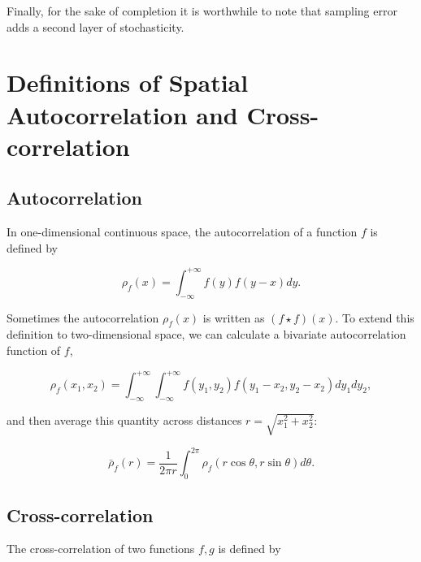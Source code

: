 \documentclass{article}
\begin{document}
Finally, for the sake of completion it is worthwhile to note that
sampling error adds a second layer of stochasticity.

\newpage

\appendix

\hypertarget{definitions-of-spatial-autocorrelation-and-cross-correlation}{%
\section{\texorpdfstring{Definitions of Spatial Autocorrelation and
Cross-correlation
\label{corr-defs}}{Definitions of Spatial Autocorrelation and Cross-correlation }}\label{definitions-of-spatial-autocorrelation-and-cross-correlation}}

\hypertarget{autocorrelation}{%
\subsection{Autocorrelation}\label{autocorrelation}}

In one-dimensional continuous space, the autocorrelation of a function
\(f\) is defined by

\begin{equation}
  \rho_f(x)=\int_{-\infty}^{+\infty}f(y)f(y-x)dy.
\end{equation}

Sometimes the autocorrelation \(\rho_f(x)\) is written as
\((f\star f)(x)\). To extend this definition to two-dimensional space,
we can calculate a bivariate autocorrelation function of \(f\),

\begin{equation}
  \rho_f(x_1,x_2)=\int_{-\infty}^{+\infty}\int_{-\infty}^{+\infty}f(y_1,y_2)f(y_1-x_2,y_2-x_2)dy_1dy_2,
\end{equation}

and then average this quantity across distances
\(r=\sqrt{x_1^2+x_2^2}\):

\begin{equation}
  \bar\rho_f(r)=\frac{1}{2\pi r}\int_0^{2\pi}\rho_f(r\cos\theta,r\sin\theta)d\theta.
\end{equation}

\hypertarget{cross-correlation}{%
\subsection{Cross-correlation}\label{cross-correlation}}

The cross-correlation of two functions \(f,g\) is defined by
\end{document}

